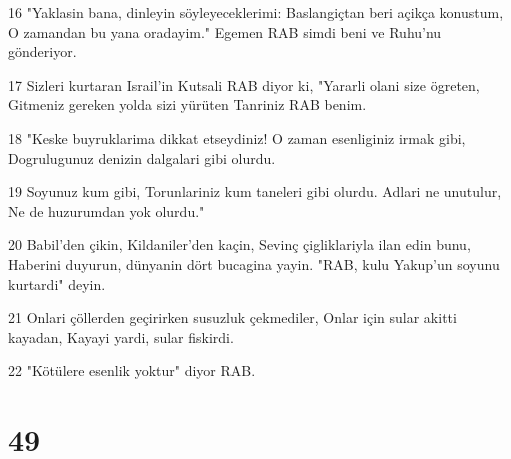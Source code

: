 \par 16 "Yaklasin bana, dinleyin söyleyeceklerimi: Baslangiçtan beri açikça konustum, O zamandan bu yana oradayim." Egemen RAB simdi beni ve Ruhu'nu gönderiyor.
\par 17 Sizleri kurtaran Israil'in Kutsali RAB diyor ki, "Yararli olani size ögreten, Gitmeniz gereken yolda sizi yürüten Tanriniz RAB benim.
\par 18 "Keske buyruklarima dikkat etseydiniz! O zaman esenliginiz irmak gibi, Dogrulugunuz denizin dalgalari gibi olurdu.
\par 19 Soyunuz kum gibi, Torunlariniz kum taneleri gibi olurdu. Adlari ne unutulur, Ne de huzurumdan yok olurdu."
\par 20 Babil'den çikin, Kildaniler'den kaçin, Sevinç çigliklariyla ilan edin bunu, Haberini duyurun, dünyanin dört bucagina yayin. "RAB, kulu Yakup'un soyunu kurtardi" deyin.
\par 21 Onlari çöllerden geçirirken susuzluk çekmediler, Onlar için sular akitti kayadan, Kayayi yardi, sular fiskirdi.
\par 22 "Kötülere esenlik yoktur" diyor RAB.

\chapter{49}

